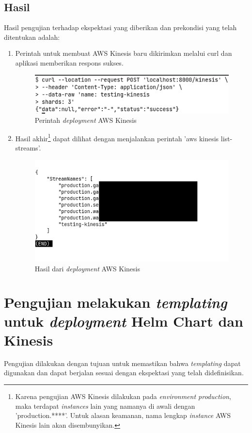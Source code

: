 \subsection{Hasil}
Hasil pengujian terhadap ekspektasi yang diberikan dan prekondisi yang telah ditentukan adalah:
\begin{enumerate}
    \item Perintah untuk membuat AWS Kinesis baru dikirimkan melalui curl dan aplikasi memberikan respons sukses.
    \begin{figure}
    	\centering
    	\includegraphics[width=1\textwidth]{pics/5.3.curl.png}
    	\caption{Perintah \textit{deployment} AWS Kinesis}
    	\label{fig:curlAwsKinesis}
    \end{figure}
    \item Hasil akhir\footnote{Karena pengujian AWS Kinesis dilakukan pada \textit{environment production}, maka terdapat \textit{instances} lain yang namanya di awali dengan 'production.****'. Untuk alasan keamanan, nama lengkap \textit{instance} AWS Kinesis lain akan disembunyikan.} dapat dilihat dengan menjalankan perintah 'aws kinesis list-streams'. 
    
    \begin{figure}
    	\centering
    	\includegraphics[width=1\textwidth]{pics/5.3.listStreams.png}
    	\caption{Hasil dari \textit{deployment} AWS Kinesis}
    	\label{fig:awsKinesis}
    \end{figure}
\end{enumerate}

\section{Pengujian melakukan \textit{templating} untuk \textit{deployment} Helm Chart dan Kinesis}
\label{sec:templateTest}
Pengujian dilakukan dengan tujuan untuk memastikan bahwa \textit{templating} dapat digunakan dan dapat berjalan sesuai dengan ekspektasi yang telah didefinisikan.
